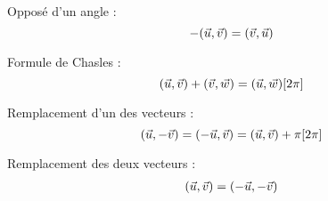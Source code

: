 
Opposé d'un angle :
\begin{equation}
-(\vec{u}, \vec{v}) = (\vec{v}, \vec{u})
\label{eq:oppose}
\end{equation}

Formule de Chasles :
\begin{equation}
(\vec{u}, \vec{v}) + (\vec{v}, \vec{w}) = (\vec{u}, \vec{w}) [2\pi]
\label{eq:chasles}
\end{equation}

Remplacement d'un des vecteurs :
\begin{equation}
(\vec{u}, -\vec{v}) = (-\vec{u}, \vec{v}) = (\vec{u}, \vec{v}) + \pi [2\pi]
\end{equation}

Remplacement des deux vecteurs :
\begin{eqnarray}
(\vec{u}, \vec{v}) = (-\vec{u}, -\vec{v})
\label{eq:opposes2}
\end{eqnarray}